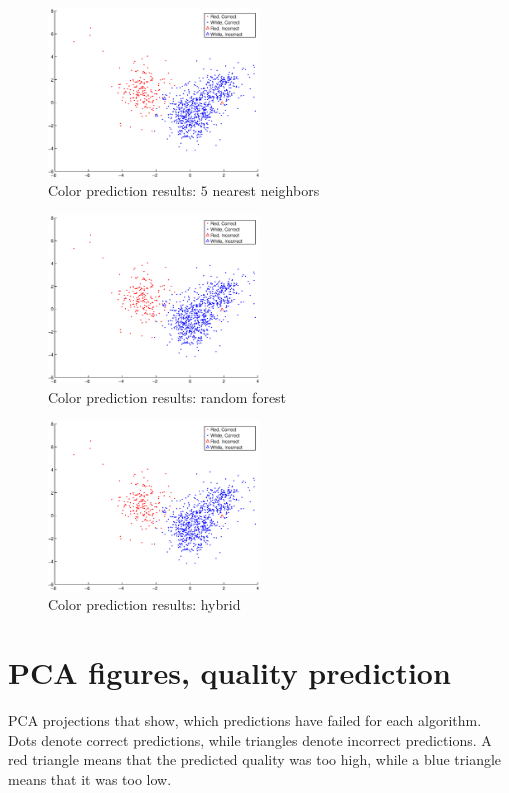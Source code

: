 \documentclass[twoside]{article}
\begin{document}
\begin{multicols}{2}
\begin{figure}[H]
\centering
\includegraphics[width=0.5\textwidth]{colorpca/knn5}
\caption{Color prediction results: $5$ nearest neighbors}
\end{figure}

\begin{figure}[H]
\centering
\includegraphics[width=0.5\textwidth]{colorpca/random_forest}
\caption{Color prediction results: random forest}
\end{figure}

\begin{figure}[H]
\centering
\includegraphics[width=0.5\textwidth]{colorpca/cvv2f_f}
\caption{Color prediction results: hybrid}
\end{figure}

\section{PCA figures, quality prediction}\label{appendix:qualitypcakuvet}
PCA projections that show, which predictions have failed for each algorithm.
Dots denote correct predictions, while triangles denote incorrect predictions.
A red triangle means that the predicted quality was too high, while a blue
triangle means that it was too low.


\end{multicols}
\end{document}

